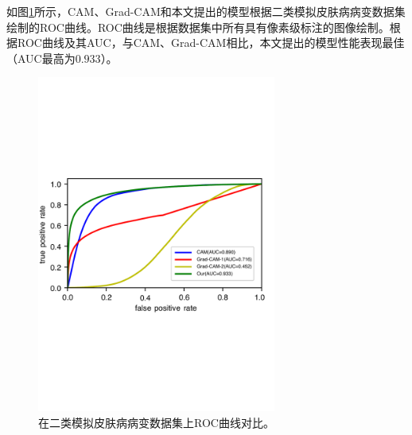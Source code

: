 如图\ref{fig:roc_cam_grad_cam_our_simulated_skin_datasets}所示，CAM、Grad-CAM和本文提出的模型根据二类模拟皮肤病病变数据集绘制的ROC曲线。ROC曲线是根据数据集中所有具有像素级标注的图像绘制。根据ROC曲线及其AUC，与CAM、Grad-CAM相比，本文提出的模型性能表现最佳（AUC最高为$0.933$）。
\begin{figure}[H]
	\centering
	\includegraphics[width=0.7\textwidth]{figure/ROC_cam_grad_cam_our_simulated_skin_datasets}
	\caption[在二类模拟皮肤病病变数据集上ROC曲线对比]{在二类模拟皮肤病病变数据集上ROC曲线对比。}
	\label{fig:roc_cam_grad_cam_our_simulated_skin_datasets}
\end{figure}

